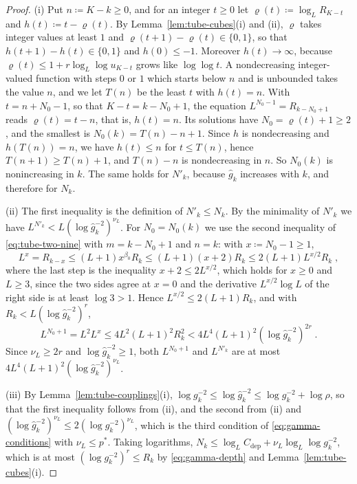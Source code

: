 \documentclass[11pt]{preprint}
\numberwithin{equation}{section}
\theoremstyle{definition}
\theoremstyle{remark}
\theoremstyle{plain}
\begin{document}
\begin{proof}
(i) Put $n \coloneqq K - k \geq 0$, and for an integer $t \geq 0$ let $\varrho(t) \coloneqq \log_LR_{K-t}$ and $h(t) \coloneqq t - \varrho(t)$. By Lemma~\ref{lem:tube-cubes}(i) and (ii), $\varrho$ takes integer values at least $1$ and $\varrho(t + 1) - \varrho(t) \in \{ 0, 1 \}$, so that $h(t + 1) - h(t) \in \{ 0, 1 \}$ and $h(0) \leq -1$. Moreover $h(t) \to \infty$, because $\varrho(t) \leq 1 + r\log_L\log u_{K-t}$ grows like $\log\log t$. A nondecreasing integer-valued function with steps $0$ or $1$ which starts below $n$ and is unbounded takes the value $n$, and we let $T(n)$ be the least $t$ with $h(t) = n$. With $t = n + N_0 - 1$, so that $K - t = k - N_0 + 1$, the equation $L^{N_0-1} = R_{k-N_0+1}$ reads $\varrho(t) = t - n$, that is, $h(t) = n$. Its solutions have $N_0 = \varrho(t) + 1 \geq 2$, and the smallest is $N_0(k) = T(n) - n + 1$. Since $h$ is nondecreasing and $h(T(n)) = n$, we have $h(t) \leq n$ for $t \leq T(n)$, hence $T(n + 1) \geq T(n) + 1$, and $T(n) - n$ is nondecreasing in $n$. So $N_0(k)$ is nonincreasing in $k$. The same holds for $N'_k$, because $\hat g_k$ increases with $k$, and therefore for $N_k$.

(ii) The first inequality is the definition of $N'_k \leq N_k$. By the minimality of $N'_k$ we have $L^{N'_k} < L(\log\hat g_k^{-2})^{\nu_L}$. For $N_0 = N_0(k)$ we use the second inequality of \eqref{eq:tube-two-nine} with $m = k - N_0 + 1$ and $n = k$: with $x \coloneqq N_0 - 1 \geq 1$,
\begin{equation}\label{eq:depth-n-zero}
    L^{x} = R_{k-x} \leq (L + 1)x^{\beta_0}R_k \leq (L + 1)(x + 2)R_k \leq 2(L + 1)L^{x/2}R_k\;,
\end{equation}
where the last step is the inequality $x + 2 \leq 2L^{x/2}$, which holds for $x \geq 0$ and $L \geq 3$, since the two sides agree at $x = 0$ and the derivative $L^{x/2}\log L$ of the right side is at least $\log 3 > 1$. Hence $L^{x/2} \leq 2(L + 1)R_k$, and with $R_k < L(\log\hat g_k^{-2})^r$,
\begin{equation}\label{eq:depth-n-zero-bound}
    L^{N_0+1} = L^2L^{x} \leq 4L^2(L + 1)^2R_k^2 < 4L^4(L + 1)^2(\log\hat g_k^{-2})^{2r}\;.
\end{equation}
Since $\nu_L \geq 2r$ and $\log\hat g_k^{-2} \geq 1$, both $L^{N_0+1}$ and $L^{N'_k}$ are at most $4L^4(L + 1)^2(\log\hat g_k^{-2})^{\nu_L}$.

(iii) By Lemma~\ref{lem:tube-couplings}(i), $\log g_k^{-2} \leq \log\hat g_k^{-2} \leq \log g_k^{-2} + \log\rho$, so that the first inequality follows from (ii), and the second from (ii) and $(\log\hat g_k^{-2})^{\nu_L} \leq 2(\log g_k^{-2})^{\nu_L}$, which is the third condition of \eqref{eq:gamma-conditions} with $\nu_L \leq p^*$. Taking logarithms, $N_k \leq \log_LC_{\mathrm{dep}} + \nu_L\log_L\log g_k^{-2}$, which is at most $(\log g_k^{-2})^r \leq R_k$ by \eqref{eq:gamma-depth} and Lemma~\ref{lem:tube-cubes}(i).
\end{proof}
\end{document}
